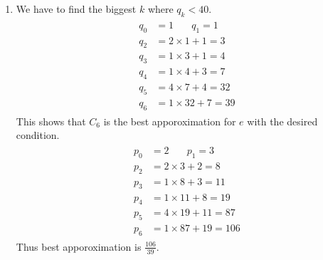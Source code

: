 \begin{enumerate}[label=\ilabel]
   \item 
      We have to find the biggest $k$ where $q_k < 40$.
      \begin{gather*}
         \begin{split}
            q_0 & = 1 \phantom{llllll} q_1 = 1 \\
            q_2 &= 2 \times 1 + 1 = 3 \\
            q_3 &= 1 \times 3 + 1 = 4 \\
            q_4 &= 1 \times 4 + 3 = 7 \\
            q_5 &= 4 \times 7 + 4 = 32 \\
            q_6 &= 1 \times 32 + 7 = 39
         \end{split}
      \end{gather*}
      This shows that $C_6$ is the best apporoximation for $e$ with the desired condition.
      \begin{gather*}
         \begin{split}
            p_0 &= 2 \phantom{llllll} p_1 = 3 \\
            p_2 &= 2 \times 3 + 2 = 8\\
            p_3 &= 1 \times 8 + 3 = 11 \\
            p_4 &= 1 \times 11 + 8 = 19 \\
            p_5 &= 4 \times 19 + 11 = 87 \\
            p_6 &= 1 \times 87 + 19 = 106
         \end{split}
      \end{gather*}
      Thus best apporoximation is $\frac{106}{39}$.
\end{enumerate}